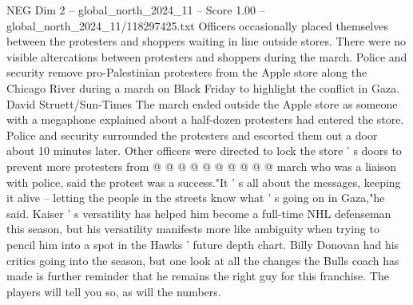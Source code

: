 \begin{textsample}{NEG Dim 2 – global\_north\_2024\_11 – Score 1.00 – global\_north\_2024\_11/118297425.txt}
Officers occasionally placed themselves between the protesters and shoppers waiting in line outside stores.
There were no visible altercations between protesters and shoppers during the march.
Police and security remove pro-Palestinian protesters from the Apple store along the Chicago River during a march on Black Friday to highlight the conflict in Gaza.
David Struett/Sun-Times The march ended outside the Apple store as someone with a megaphone explained about a half-dozen protesters had entered the store.
Police and security surrounded the protesters and escorted them out a door about 10 minutes later.
Other officers were directed to lock the store ' s doors to prevent more protesters from @ @ @ @ @ @ @ @ @ @ march who was a liaison with police, said the protest was a success."It ' s all about the messages, keeping it alive -- letting the people in the streets know what ' s going on in Gaza,"he said.
Kaiser ' s versatility has helped him become a full-time NHL defenseman this season, but his versatility manifests more like ambiguity when trying to pencil him into a spot in the Hawks ' future depth chart.
Billy Donovan had his critics going into the season, but one look at all the changes the Bulls coach has made is further reminder that he remains the right guy for this franchise.
The players will tell you so, as will the numbers.

\end{textsample}
